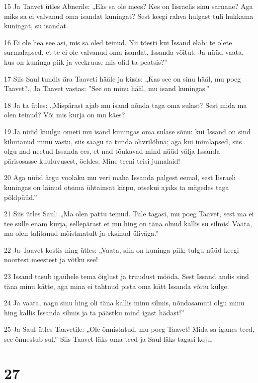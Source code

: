 \par 15 Ja Taavet ütles Abnerile: „Eks sa ole mees? Kes on Iisraelis sinu sarnane? Aga miks sa ei valvanud oma isandat kuningat? Sest keegi rahva hulgast tuli hukkama kuningat, su isandat.
\par 16 Ei ole hea see asi, mis sa oled teinud. Nii tõesti kui Issand elab: te olete surmalapsed, et te ei ole valvanud oma isandat, Issanda võitut. Ja nüüd vaata, kus on kuninga piik ja veekruus, mis olid ta peatsis?”
\par 17 Siis Saul tundis ära Taaveti hääle ja küsis: „Kas see on sinu hääl, mu poeg Taavet?„ Ja Taavet vastas: ”See on minu hääl, mu isand kuningas.”
\par 18 Ja ta ütles: „Mispärast ajab mu isand nõnda taga oma sulast? Sest mida ma olen teinud? Või mis kurja on mu käes?
\par 19 Ja nüüd kuulgu ometi mu isand kuningas oma sulase sõnu: kui Issand on sind kihutanud minu vastu, siis saagu ta tunda ohvrilõhna; aga kui inimlapsed, siis olgu nad neetud Issanda ees, et nad tõukavad mind nüüd välja Issanda pärisosasse kuuluvusest, öeldes: Mine teeni teisi jumalaid!
\par 20 Aga nüüd ärgu voolaku mu veri maha Issanda palgest eemal, sest Iisraeli kuningas on läinud otsima ühtainsat kirpu, otsekui ajaks ta mägedes taga põldpüüd.”
\par 21 Siis ütles Saul: „Ma olen pattu teinud. Tule tagasi, mu poeg Taavet, sest ma ei tee sulle enam kurja, sellepärast et mu hing on täna olnud kallis su silmis! Vaata, ma olen talitanud mõistmatult ja eksinud üliväga.”
\par 22 Ja Taavet kostis ning ütles: „Vaata, siin on kuninga piik; tulgu nüüd keegi noortest meestest ja võtku see!
\par 23 Issand tasub igaühele tema õiglust ja truudust mööda. Sest Issand andis sind täna minu kätte, aga mina ei tahtnud pista oma kätt Issanda võitu külge.
\par 24 Ja vaata, nagu sinu hing oli täna kallis minu silmis, nõndasamuti olgu minu hing kallis Issanda silmis ja ta päästku mind igast hädast!”
\par 25 Ja Saul ütles Taavetile: „Ole õnnistatud, mu poeg Taavet! Mida sa iganes teed, see õnnestub sul.” Siis Taavet läks oma teed ja Saul läks tagasi koju.

\chapter{27}

